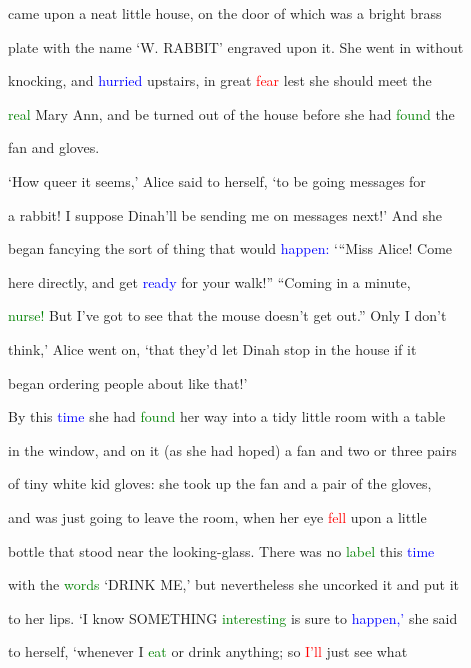  came upon a neat little house, on the door of which was a bright brass

 plate with the name ‘W. RABBIT’ engraved upon it. She went in without

 knocking, and \textcolor{blue}{hurried} upstairs, in great \textcolor{red}{fear} lest she should meet the

 \textcolor{green}{real} Mary Ann, and be turned out of the house before she had \textcolor{green}{found} the

 fan and gloves.



 ‘How queer it seems,’ Alice said to herself, ‘to be going messages for

 a rabbit! I suppose Dinah’ll be sending me on messages next!’ And she

 began \textcolor{BurntOrange}{fancying} the sort of thing that would \textcolor{blue}{happen:} ‘“Miss Alice! Come

 here directly, and get \textcolor{blue}{ready} for your walk!” “Coming in a minute,

 \textcolor{green}{nurse!} But I’ve got to see that the mouse doesn’t get out.” Only I don’t

 think,’ Alice went on, ‘that they’d let Dinah stop in the house if it

 began ordering people about like that!’



 By this \textcolor{blue}{time} she had \textcolor{green}{found} her way into a tidy little room with a table

 in the window, and on it (as she had hoped) a fan and two or three pairs

 of tiny \textcolor{BurntOrange}{white} kid gloves: she took up the fan and a pair of the gloves,

 and was just going to \textcolor{BurntOrange}{leave} the room, when her eye \textcolor{red}{fell} upon a little

 bottle that stood near the looking-glass. There was no \textcolor{green}{label} this \textcolor{blue}{time}

 with the \textcolor{green}{words} ‘DRINK ME,’ but nevertheless she uncorked it and put it

 to her lips. ‘I know SOMETHING \textcolor{green}{interesting} is sure to \textcolor{blue}{happen,’} she said

 to herself, ‘whenever I \textcolor{green}{eat} or drink anything; so \textcolor{red}{I’ll} just see what

